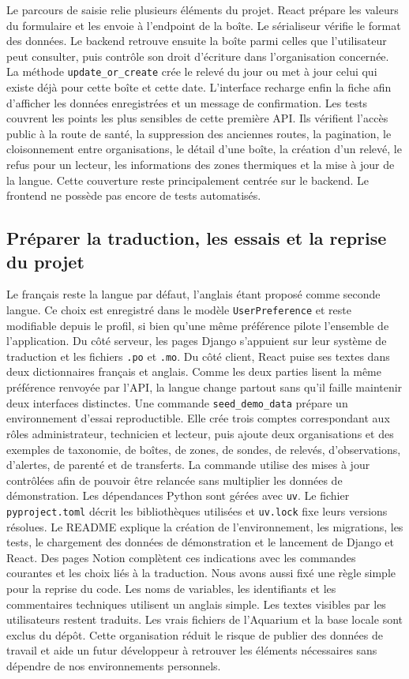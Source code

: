 \documentclass{article}
\begin{document}
Le parcours de saisie relie plusieurs éléments du projet. React prépare les valeurs du formulaire et les envoie à l’endpoint de la boîte. Le sérialiseur vérifie le format des données. Le backend retrouve ensuite la boîte parmi celles que l’utilisateur peut consulter, puis contrôle son droit d’écriture dans l’organisation concernée. La méthode \texttt{update\_or\_create} crée le relevé du jour ou met à jour celui qui existe déjà pour cette boîte et cette date. L’interface recharge enfin la fiche afin d’afficher les données enregistrées et un message de confirmation.
Les tests couvrent les points les plus sensibles de cette première API. Ils vérifient l’accès public à la route de santé, la suppression des anciennes routes, la pagination, le cloisonnement entre organisations, le détail d’une boîte, la création d’un relevé, le refus pour un lecteur, les informations des zones thermiques et la mise à jour de la langue. Cette couverture reste principalement centrée sur le backend. Le frontend ne possède pas encore de tests automatisés.

\subsection{Préparer la traduction, les essais et la reprise du projet}

Le français reste la langue par défaut, l’anglais étant proposé comme seconde langue. 
Ce choix est enregistré dans le modèle \texttt{UserPreference} et reste modifiable depuis le profil, si bien qu’une même préférence pilote l’ensemble de l’application. Du côté serveur, les pages Django s’appuient sur leur système de traduction et les fichiers \texttt{.po} et \texttt{.mo}. Du côté client, React puise ses textes dans deux dictionnaires français et anglais. Comme les deux parties lisent la même préférence renvoyée par l’API, la langue change partout sans qu’il faille maintenir deux interfaces distinctes.
Une commande \texttt{seed\_demo\_data} prépare un environnement d’essai reproductible. Elle crée trois comptes correspondant aux rôles administrateur, technicien et lecteur, puis ajoute deux organisations et des exemples de taxonomie, de boîtes, de zones, de sondes, de relevés, d’observations, d’alertes, de parenté et de transferts. La commande utilise des mises à jour contrôlées afin de pouvoir être relancée sans multiplier les données de démonstration.
Les dépendances Python sont gérées avec \texttt{uv}. Le fichier \texttt{pyproject.toml} décrit les bibliothèques utilisées et \texttt{uv.lock} fixe leurs versions résolues. Le README explique la création de l’environnement, les migrations, les tests, le chargement des données de démonstration et le lancement de Django et React. Des pages Notion complètent ces indications avec les commandes courantes et les choix liés à la traduction.
Nous avons aussi fixé une règle simple pour la reprise du code. Les noms de variables, les identifiants et les commentaires techniques utilisent un anglais simple. Les textes visibles par les utilisateurs restent traduits. Les vrais fichiers de l’Aquarium et la base locale sont exclus du dépôt. Cette organisation réduit le risque de publier des données de travail et aide un futur développeur à retrouver les éléments nécessaires sans dépendre de nos environnements personnels.
\end{document}
